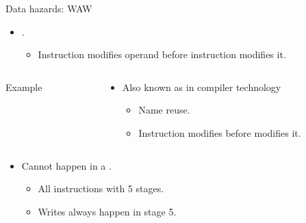 \begin{frame}[t,fragile]{Data hazards: WAW}
\begin{itemize}
  \item {}.
    \begin{itemize}
      \item Instruction  modifies operand before
            instruction  modifies it.
    \end{itemize}
\end{itemize}
\begin{columns}
\begin{column}{.25\textwidth}
\begin{block}{Example}

\end{block}
\end{column}
\begin{column}{.75\textwidth}
\begin{itemize}
  \item Also known as  in compiler technology
    \begin{itemize}
      \item Name reuse.
      \item Instruction  modifies 
            before  modifies it.
    \end{itemize}
\end{itemize}
\end{column}
\end{columns}
\begin{itemize}
  \item \alert{Cannot} happen in a .
  \begin{itemize}
    \item All instructions with 5 stages.
    \item Writes always happen in stage 5.
  \end{itemize}
\end{itemize}
\end{frame}

